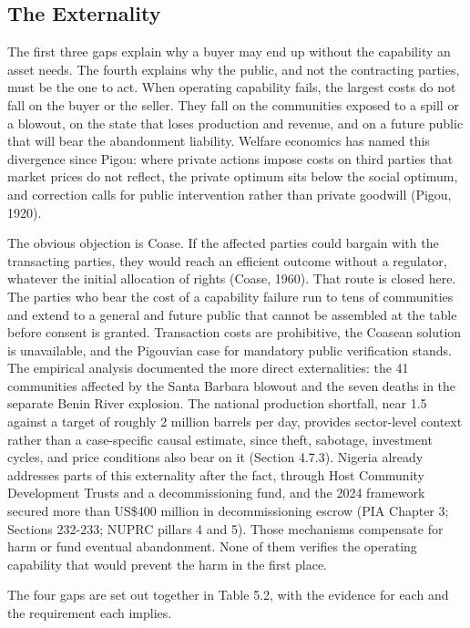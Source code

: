 \hypertarget{the-externality}{%
\subsection{The Externality}\label{the-externality}}

The first three gaps explain why a buyer may end up without the
capability an asset needs. The fourth explains why the public, and not
the contracting parties, must be the one to act. When operating
capability fails, the largest costs do not fall on the buyer or the
seller. They fall on the communities exposed to a spill or a blowout, on
the state that loses production and revenue, and on a future public that
will bear the abandonment liability. Welfare economics has named this
divergence since Pigou: where private actions impose costs on third
parties that market prices do not reflect, the private optimum sits
below the social optimum, and correction calls for public intervention
rather than private goodwill (Pigou, 1920).

The obvious objection is Coase. If the affected parties could bargain
with the transacting parties, they would reach an efficient outcome
without a regulator, whatever the initial allocation of rights (Coase,
1960). That route is closed here. The parties who bear the cost of a
capability failure run to tens of communities and extend to a general
and future public that cannot be assembled at the table before consent
is granted. Transaction costs are prohibitive, the Coasean solution is
unavailable, and the Pigouvian case for mandatory public verification
stands. The empirical analysis documented the more direct externalities:
the 41 communities affected by the Santa Barbara blowout and the seven
deaths in the separate Benin River explosion. The national production
shortfall, near 1.5 against a target of roughly 2 million barrels per
day, provides sector-level context rather than a case-specific causal
estimate, since theft, sabotage, investment cycles, and price conditions
also bear on it (Section 4.7.3). Nigeria already addresses parts of this
externality after the fact, through Host Community Development Trusts
and a decommissioning fund, and the 2024 framework secured more than
US\$400 million in decommissioning escrow (PIA Chapter 3; Sections
232-233; NUPRC pillars 4 and 5). Those mechanisms compensate for harm or
fund eventual abandonment. None of them verifies the operating
capability that would prevent the harm in the first place.

The four gaps are set out together in Table 5.2, with the evidence for
each and the requirement each implies.

